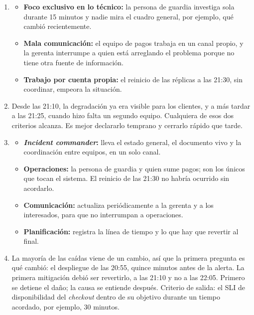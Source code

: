 \documentclass[variant=guia,cover=institutional,mode=screen]{ua-engineering-v6-article}
\begin{document}
\begin{uaanswer}
\begin{enumerate}
\item \begin{itemize}
\item \textbf{Foco exclusivo en lo técnico:} la persona de guardia investiga sola durante 15 minutos y nadie mira el cuadro general, por ejemplo, qué cambió recientemente.
\item \textbf{Mala comunicación:} el equipo de pagos trabaja en un canal propio, y la gerenta interrumpe a quien está arreglando el problema porque no tiene otra fuente de información.
\item \textbf{Trabajo por cuenta propia:} el reinicio de las réplicas a las 21:30, sin coordinar, empeora la situación.
\end{itemize}
\item Desde las 21:10, la degradación ya era visible para los clientes, y a más tardar a las 21:25, cuando hizo falta un segundo equipo. Cualquiera de esos dos criterios alcanza. Es mejor declararlo temprano y cerrarlo rápido que tarde.
\item \begin{itemize}
\item \textbf{\emph{Incident commander}:} lleva el estado general, el documento vivo y la coordinación entre equipos, en un solo canal.
\item \textbf{Operaciones:} la persona de guardia y quien sume pagos; son los únicos que tocan el sistema. El reinicio de las 21:30 no habría ocurrido sin acordarlo.
\item \textbf{Comunicación:} actualiza periódicamente a la gerenta y a los interesados, para que no interrumpan a operaciones.
\item \textbf{Planificación:} registra la línea de tiempo y lo que hay que revertir al final.
\end{itemize}
\item La mayoría de las caídas viene de un cambio, así que la primera pregunta es qué cambió: el despliegue de las 20:55, quince minutos antes de la alerta. La primera mitigación debió ser revertirlo, a las 21:10 y no a las 22:05. Primero se detiene el daño; la causa se entiende después. Criterio de salida: el SLI de disponibilidad del \emph{checkout} dentro de su objetivo durante un tiempo acordado, por ejemplo, 30 minutos.
\end{enumerate}
\end{uaanswer}
\end{document}
